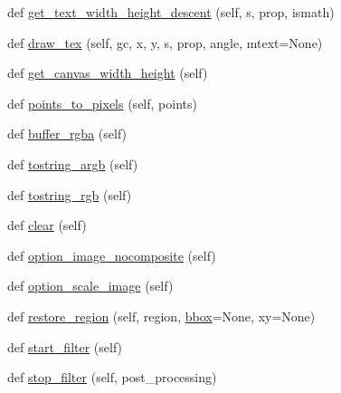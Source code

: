 \begin{DoxyCompactItemize}
\item 
def \hyperlink{classmatplotlib_1_1backends_1_1backend__agg_1_1RendererAgg_a7b603379f5f198409880d4a07fec8dbc}{get\+\_\+text\+\_\+width\+\_\+height\+\_\+descent} (self, s, prop, ismath)
\item 
def \hyperlink{classmatplotlib_1_1backends_1_1backend__agg_1_1RendererAgg_aadd5fd866f8a68a2eb9f564579b44868}{draw\+\_\+tex} (self, gc, x, y, s, prop, angle, mtext=None)
\item 
def \hyperlink{classmatplotlib_1_1backends_1_1backend__agg_1_1RendererAgg_a8c168bb442bb9eda7c0ea9bba688ede4}{get\+\_\+canvas\+\_\+width\+\_\+height} (self)
\item 
def \hyperlink{classmatplotlib_1_1backends_1_1backend__agg_1_1RendererAgg_aa2f094b5ee6780ba219f958e8ed3ce1d}{points\+\_\+to\+\_\+pixels} (self, points)
\item 
def \hyperlink{classmatplotlib_1_1backends_1_1backend__agg_1_1RendererAgg_afeaa246e94e3f82b28822a148b9229af}{buffer\+\_\+rgba} (self)
\item 
def \hyperlink{classmatplotlib_1_1backends_1_1backend__agg_1_1RendererAgg_af26c0dc4d559d05c23c37180441bf148}{tostring\+\_\+argb} (self)
\item 
def \hyperlink{classmatplotlib_1_1backends_1_1backend__agg_1_1RendererAgg_a2964c4dee17616376b0be0a67d5b4592}{tostring\+\_\+rgb} (self)
\item 
def \hyperlink{classmatplotlib_1_1backends_1_1backend__agg_1_1RendererAgg_a8ebbeaecbe2ec776e192d9ca5e4fae84}{clear} (self)
\item 
def \hyperlink{classmatplotlib_1_1backends_1_1backend__agg_1_1RendererAgg_a701cd2918fac3e48e362e6e1a5c619fb}{option\+\_\+image\+\_\+nocomposite} (self)
\item 
def \hyperlink{classmatplotlib_1_1backends_1_1backend__agg_1_1RendererAgg_a9040f0e4082c0b3f8f5e66ebbeb2a770}{option\+\_\+scale\+\_\+image} (self)
\item 
def \hyperlink{classmatplotlib_1_1backends_1_1backend__agg_1_1RendererAgg_aa7cbfe00d2da217278f2bbd64a4a4fd1}{restore\+\_\+region} (self, region, \hyperlink{classmatplotlib_1_1backends_1_1backend__agg_1_1RendererAgg_a37b101db0879f86811262c091aa7da8d}{bbox}=None, xy=None)
\item 
def \hyperlink{classmatplotlib_1_1backends_1_1backend__agg_1_1RendererAgg_a6ad7cd62e6e72921be1cc4f6e6c9adeb}{start\+\_\+filter} (self)
\item 
def \hyperlink{classmatplotlib_1_1backends_1_1backend__agg_1_1RendererAgg_ab9afe8e513e546037eca82c1fa329d95}{stop\+\_\+filter} (self, post\+\_\+processing)
\end{DoxyCompactItemize}
